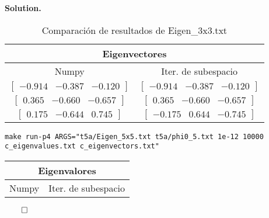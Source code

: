 \documentclass{article}
\theoremstyle{problemstyle}
\newenvironment{solution}{%
  \begin{mdframed}[linewidth=0.8pt,linecolor=Gray,backgroundcolor=Gray!5,roundcorner=5pt]%
  \noindent\textbf{Solution.}%
}{%
\hfill $ \qed $ 
  \end{mdframed}%
}
\begin{document}
\begin{solution}
\begin{table}[H]
    \begin{center}
        \begin{tabular}{|c|c|}
            \multicolumn{2}{c}{Eigenvectores}               \\
            \hline
            Numpy                   &Iter. de subespacio\\
            \hline
            \rule{0pt}{1.5em}
            $ \begin{bmatrix}
                    -0.914 & -0.387 & -0.120
              \end{bmatrix} $ &
            $ \begin{bmatrix}
                    -0.914 & -0.387 & -0.120
              \end{bmatrix} $                        \\
            [0.5em]
            \hline
            \rule{0pt}{1.5em}
            $ \begin{bmatrix}
                    0.365 & -0.660 & -0.657
              \end{bmatrix} $ & $ \begin{bmatrix}
                                      0.365 & -0.660 & -0.657
                                  \end{bmatrix} $   \\
            [0.5em]
            \hline
            \rule{0pt}{1.5em}
            $ \begin{bmatrix}
                    0.175 & -0.644 & 0.745
              \end{bmatrix} $  & $ \begin{bmatrix}
                                        -0.175 & 0.644 & -0.745
                                    \end{bmatrix} $ \\
            [0.5em]
            \hline
        \end{tabular}

    \end{center}
    \caption{Comparaci\'on de resultados de Eigen\_3x3.txt}\label{tab:evecs3x3_latest}
\end{table}


\begin{center}
  \texttt{make run-p4 ARGS="t5a/Eigen\_5x5.txt t5a/phi0\_5.txt 1e-12 10000 c\_eigenvalues.txt c\_eigenvectors.txt"}
\end{center}

\begin{table}[H]
    \begin{center}
        \begin{tabular}{|c|c|}
            \multicolumn{2}{c}{Eigenvalores}   \\
            \hline
            Numpy             & Iter. de subespacio\\
            \hline


\end{tabular}
\end{center}
\end{table}
\end{solution}
\end{document}
